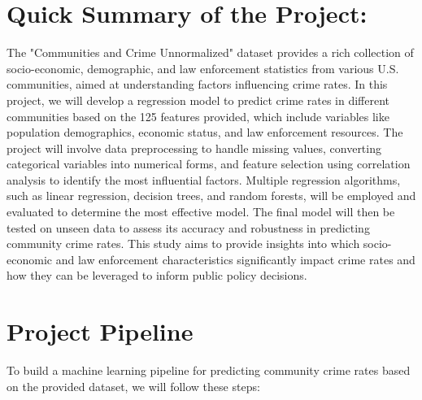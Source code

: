 \documentclass{article}
\begin{document}
\section*{Quick Summary of the Project:}

The "Communities and Crime Unnormalized" dataset provides a rich collection of socio-economic, demographic, and law enforcement statistics from various U.S. communities, aimed at understanding factors influencing crime rates. In this project, we will develop a regression model to predict crime rates in different communities based on the 125 features provided, which include variables like population demographics, economic status, and law enforcement resources. The project will involve data preprocessing to handle missing values, converting categorical variables into numerical forms, and feature selection using correlation analysis to identify the most influential factors. Multiple regression algorithms, such as linear regression, decision trees, and random forests, will be employed and evaluated to determine the most effective model. The final model will then be tested on unseen data to assess its accuracy and robustness in predicting community crime rates. This study aims to provide insights into which socio-economic and law enforcement characteristics significantly impact crime rates and how they can be leveraged to inform public policy decisions.

\section*{Project Pipeline}
To build a machine learning pipeline for predicting community crime rates based on the provided dataset, we will follow these steps:
\end{document}
